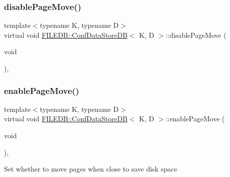 \subsubsection{\texorpdfstring{disablePageMove()}{disablePageMove()}\hspace{0.1cm}{\footnotesize\ttfamily [2/2]}}
{\footnotesize\ttfamily template$<$typename K, typename D$>$ \\
virtual void \mbox{\hyperlink{classFILEDB_1_1ConfDataStoreDB}{F\+I\+L\+E\+D\+B\+::\+Conf\+Data\+Store\+DB}}$<$ K, D $>$\+::disable\+Page\+Move (\begin{DoxyParamCaption}\item[{void}]{ }\end{DoxyParamCaption})\hspace{0.3cm}{\ttfamily [inline]}, {\ttfamily [virtual]}}

\mbox{\label{classFILEDB_1_1ConfDataStoreDB_ae8f437f44366624ac0d5aba306a5ba42}} 
\subsubsection{\texorpdfstring{enablePageMove()}{enablePageMove()}\hspace{0.1cm}{\footnotesize\ttfamily [1/2]}}
{\footnotesize\ttfamily template$<$typename K, typename D$>$ \\
virtual void \mbox{\hyperlink{classFILEDB_1_1ConfDataStoreDB}{F\+I\+L\+E\+D\+B\+::\+Conf\+Data\+Store\+DB}}$<$ K, D $>$\+::enable\+Page\+Move (\begin{DoxyParamCaption}\item[{void}]{ }\end{DoxyParamCaption})\hspace{0.3cm}{\ttfamily [inline]}, {\ttfamily [virtual]}}

Set whether to move pages when close to save disk space

